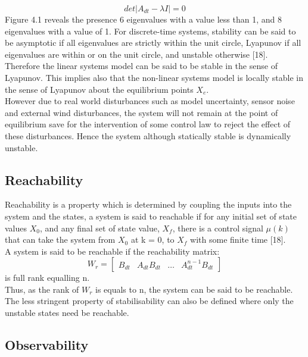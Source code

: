 \documentclass[12pt,a4paper,twoside]{report}
\begin{document}
				\begin{equation}
					det|A_{dt} - \lambda I| = 0
				\end{equation}
				\space
				Figure 4.1 reveals the presence 6 eigenvalues with a value less than 1, and 8 eigenvalues with a value of 1. For discrete-time systems, stability can be said to be asymptotic if all eigenvalues are strictly within the unit circle, Lyapunov if all eigenvalues are within or on the unit circle, and unstable otherwise [18]. Therefore the linear systems model can be said to be stable in the sense of Lyapunov. This implies also that the non-linear systems model is locally stable in the sense of Lyapunov about the equilibrium points $X_e$.
				\\
				However due to real world disturbances such as model uncertainty, sensor noise and external wind disturbances, the system will not remain at the point of equilibrium save for the intervention of some control law to reject the effect of these disturbances. Hence the system although statically stable is dynamically unstable.
				
			\subsection{Reachability}
				
				Reachability is a property which is determined by coupling the inputs into the system and the states, a system is said to reachable if for any initial set of state values $X_0$, and any final set of state value, $X_f$, there is a control signal $\mu(k)$ that can take the system from $X_0$ at k = 0, to  $X_f$ with some finite time [18].
				\\
				A system is said to be reachable if the reachability matrix:
				\begin{equation}
				W_r = 
					\begin{bmatrix}
					B_{dt} & A_{dt}B_{dt} & \dots & A_{dt}^{n-1}B_{dt}
					\end{bmatrix}
				\end{equation}
				is full rank equalling n.
				\\
				Thus, as the rank of $W_r$ is equals to n, the system can be said to be reachable. 
				\\
				The less stringent property of stabilisability can also be defined where only the unstable states need be reachable.
				
			\subsection{Observability}
				
\end{document}
